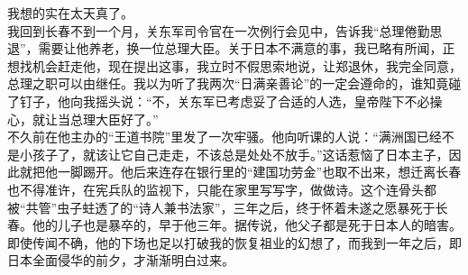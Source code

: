 我想的实在太天真了。\\

我回到长春不到一个月，关东军司令官在一次例行会见中，告诉我“总理倦勤思退”，需要让他养老，换一位总理大臣。关于日本不满意的事，我已略有所闻，正想找机会赶走他，现在提出这事，我立时不假思索地说，让郑退休，我完全同意，总理之职可以由继任。我以为听了我两次“日满亲善论”的一定会遵命的，谁知竟碰了钉子，他向我摇头说：“不，关东军已考虑妥了合适的人选，皇帝陛下不必操心，就让当总理大臣好了。”\\

不久前在他主办的“王道书院”里发了一次牢骚。他向听课的人说：“满洲国已经不是小孩子了，就该让它自己走走，不该总是处处不放手。”这话惹恼了日本主子，因此就把他一脚踢开。他后来连存在银行里的“建国功劳金”也取不出来，想迁离长春也不得准许，在宪兵队的监视下，只能在家里写写字，做做诗。这个连骨头都被“共管”虫子蛀透了的“诗人兼书法家”，三年之后，终于怀着未遂之愿暴死于长春。他的儿子也是暴卒的，早于他三年。据传说，他父子都是死于日本人的暗害。即使传闻不确，他的下场也足以打破我的恢复祖业的幻想了，而我到一年之后，即日本全面侵华的前夕，才渐渐明白过来。
